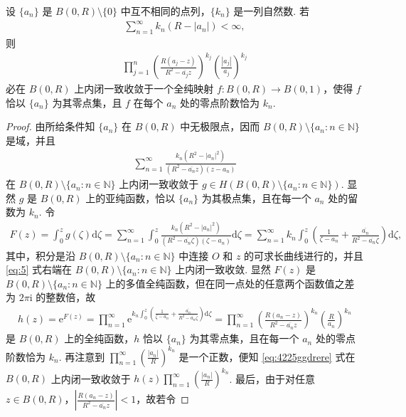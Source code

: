 \documentclass[../../main.tex]{subfiles}%
\begin{document}
\begin{theorem}\label{thm:blaschke}
设 \(\{a_n\}\) 是 \(B(0, R) \setminus \{0\}\) 中互不相同的点列，\(\{k_n\}\) 是一列自然数. 若
\begin{align*}
\sum_{n=1}^\infty k_n (R - |a_n|) < \infty,
\end{align*}
则
\begin{align}\label{eq:4225ggdrere}
\prod_{j=1}^n \left( \frac{R(a_j - z)}{R^2 - \overline{a_j} z} \right)^{k_j} \left( \frac{|a_j|}{a_j} \right)^{k_j}
\end{align}
必在 \(B(0, R)\) 上内闭一致收敛于一个全纯映射 \(f: B(0, R) \to B(0, 1)\)，使得 \(f\) 恰以 \(\{a_n\}\) 为其零点集，且 \(f\) 在每个 \(a_n\) 处的零点阶数恰为 \(k_n\).
\end{theorem}
\begin{proof}
由所给条件知 \(\{a_n\}\) 在 \(B(0, R)\) 中无极限点，因而 \(B(0, R) \setminus \{a_n : n \in \mathbb{N}\}\) 是域，并且
\begin{align*}
\sum_{n=1}^\infty \frac{k_n (R^2 - |a_n|^2)}{(R^2 - \overline{a_n} z)(z - a_n)}
\end{align*}
在 \(B(0, R) \setminus \{a_n : n \in \mathbb{N}\}\) 上内闭一致收敛于 \(g \in H(B(0, R) \setminus \{a_n : n \in \mathbb{N}\})\). 显然 \(g\) 是 \(B(0, R)\) 上的亚纯函数，恰以 \(\{a_n\}\) 为其极点集，且在每一个 \(a_n\) 处的留数为 \(k_n\). 令
\begin{align} \label{eq:5}
F(z) = \int_0^z g(\zeta) \mathrm{d}\zeta = \sum_{n=1}^\infty \int_0^z \frac{k_n (R^2 - |a_n|^2)}{(R^2 - \overline{a_n} \zeta)(\zeta - a_n)} \mathrm{d}\zeta = \sum_{n=1}^\infty k_n \int_0^z \left( \frac{1}{\zeta - a_n} + \frac{\overline{a_n}}{R^2 - \overline{a_n} \zeta} \right) \mathrm{d}\zeta,
\end{align}
其中，积分是沿 \(B(0, R) \setminus \{a_n : n \in \mathbb{N}\}\) 中连接 \(O\) 和 \(z\) 的可求长曲线进行的，并且 \eqref{eq:5} 式右端在 \(B(0, R) \setminus \{a_n : n \in \mathbb{N}\}\) 上内闭一致收敛. 显然 \(F(z)\) 是 \(B(0, R) \setminus \{a_n : n \in \mathbb{N}\}\) 上的多值全纯函数，但在同一点处的任意两个函数值之差为 \(2\pi \mathrm{i}\) 的整数倍，故
\begin{align*}
h(z) = \mathrm{e}^{F(z)} = \prod_{n=1}^\infty \mathrm{e}^{k_n \int_0^z \left( \frac{1}{\zeta - a_n} + \frac{\overline{a_n}}{R^2 - \overline{a_n} \zeta} \right) \mathrm{d}\zeta} = \prod_{n=1}^\infty \left( \frac{R(a_n - z)}{R^2 - \overline{a_n} z} \right)^{k_n} \left( \frac{R}{a_n} \right)^{k_n}
\end{align*}
是 \(B(0, R)\) 上的全纯函数，\(h\) 恰以 \(\{a_n\}\) 为其零点集，且在每一个 \(a_n\) 处的零点阶数恰为 \(k_n\). 再注意到 \(\prod\limits_{n=1}^\infty \left( \frac{|a_n|}{R} \right)^{k_n}\) 是一个正数，便知 \eqref{eq:4225ggdrere} 式在 \(B(0, R)\) 上内闭一致收敛于 \(h(z) \prod\limits_{n=1}^\infty \left( \frac{|a_n|}{R} \right)^{k_n}\). 最后，由于对任意 \(z \in B(0, R)\)，\(\left| \frac{R(a_n - z)}{R^2 - \overline{a_n} z} \right| < 1\)，故若令

\end{proof}
\end{document}
